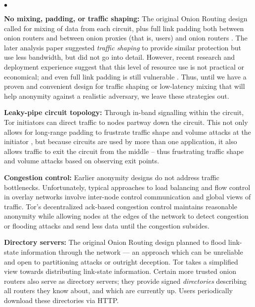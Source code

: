 \documentclass[times,10pt,twocolumn]{article}
\newenvironment{tightlist}{\begin{list}{$\bullet$}{
  \setlength{\itemsep}{0mm}
    \setlength{\parsep}{0mm}
    }}{\end{list}}
\begin{document}
\begin{tightlist}
\item \textbf{No mixing, padding, or traffic shaping:} The original
Onion Routing design called for mixing of data from each circuit,
plus full link padding both between onion routers and between onion
proxies (that is, users) and onion routers \cite{or-jsac98}. The
later analysis paper \cite{or-pet00} suggested \emph{traffic shaping}
to provide similar protection but use less bandwidth, but did not go
into detail. However, recent research \cite{econymics} and deployment
experience \cite{freedom21-security} suggest that this level of resource
use is not practical or economical; and even full link padding is still
vulnerable \cite{defensive-dropping}. Thus, until we have a proven and
convenient design for traffic shaping or low-latency mixing that will help
anonymity against a realistic adversary, we leave these strategies out.

\item \textbf{Leaky-pipe circuit topology:} Through in-band
  signalling within the
  circuit, Tor initiators can direct traffic to nodes partway down the
  circuit. This not only allows for long-range padding to frustrate traffic
  shape and volume attacks at the initiator \cite{defensive-dropping},
  but because circuits are used by more than one application, it also
  allows traffic to exit the circuit from the middle -- thus
  frustrating traffic shape and volume attacks based on observing exit
  points.

\item \textbf{Congestion control:} Earlier anonymity designs do not
address traffic bottlenecks. Unfortunately, typical approaches to load
balancing and flow control in overlay networks involve inter-node control
communication and global views of traffic. Tor's decentralized ack-based
congestion control maintains reasonable anonymity while allowing nodes
at the edges of the network to detect congestion or flooding attacks
and send less data until the congestion subsides.

\item \textbf{Directory servers:} The original Onion Routing design
planned to flood link-state information through the network --- an
approach which can be unreliable and
open to partitioning attacks or outright deception. Tor takes a simplified
view towards distributing link-state information. Certain more trusted
onion routers also serve as directory servers; they provide signed
\emph{directories} describing all routers they know about, and which
are currently up. Users periodically download these directories via HTTP.


\end{tightlist}
\end{document}
